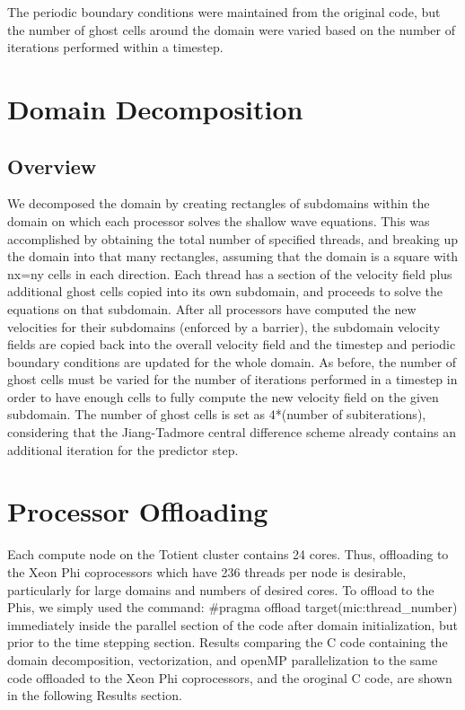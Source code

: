 \documentclass{article}
\begin{document}
The periodic boundary conditions were maintained from the original code, but the number of ghost cells around the domain were varied based on the number of iterations performed within a timestep. \\

\section{Domain Decomposition}
\subsection{Overview}
We decomposed the domain by creating rectangles of subdomains within the domain on which each processor solves the shallow wave equations. This was accomplished by obtaining the total number of specified threads, and breaking up the domain into that many rectangles, assuming that the domain is a square with nx=ny cells in each direction. Each thread has a section of the velocity field plus additional ghost cells copied into its own subdomain, and proceeds to solve the equations on that subdomain. After all processors have computed the new velocities for their subdomains (enforced by a barrier), the subdomain velocity fields are copied back into the overall velocity field and the timestep and periodic boundary conditions are updated for the whole domain. As before, the number of ghost cells must be varied for the number of iterations performed in a timestep in order to have enough cells to fully compute the new velocity field on the given subdomain. The number of ghost cells is set as 4*(number of subiterations), considering that the Jiang-Tadmore central difference scheme already contains an additional iteration for the predictor step.\\

\section{Processor Offloading}
Each compute node on the Totient cluster contains 24 cores. Thus, offloading to the Xeon Phi coprocessors which have 236 threads per node is desirable, particularly for large domains and numbers of desired cores. To offload to the Phis, we simply used the command: \#pragma offload target(mic:thread\_number) immediately inside the parallel section of the code after domain initialization, but prior to the time stepping section. Results comparing the C code containing the domain decomposition, vectorization, and openMP parallelization to the same code offloaded to the Xeon Phi coprocessors, and the oroginal C code, are shown in the following Results section. \\
\end{document}
